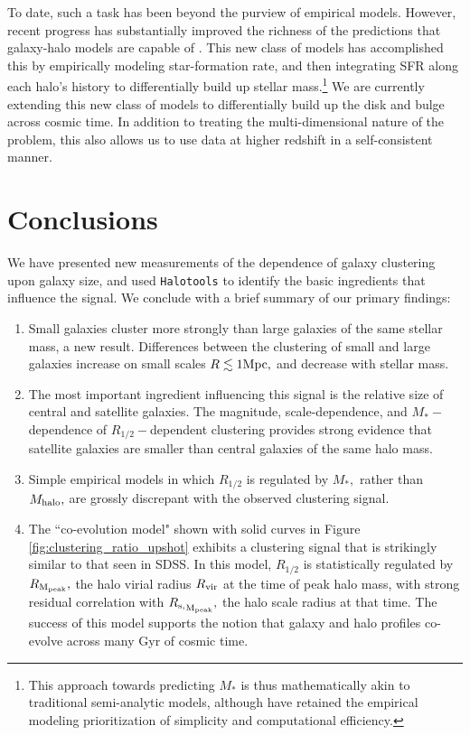 \documentclass[usenatbib,usegraphicx,letterpaper]{mn2e}
\newcommand{\ben}{\begin{enumerate}}
\newcommand{\een}{\end{enumerate}}
\newcommand{\rhalf}{R_{1/2}}
\newcommand{\mstar}{M_{\ast}}
\newcommand{\mhalo}{M_{\rm halo}}
\newcommand{\rvir}{R_{\rm vir}}
\newcommand{\rmpeak}{R_{\rm M_{peak}}}
\newcommand{\rspeak}{{R_{\rm s,}}_{\rm M_{peak}}}
\newcommand{\mpc}{{\rm Mpc}}
\begin{document}
To date, such a task has been beyond the purview of empirical models. However, recent progress has substantially improved the richness of the predictions that galaxy-halo models are capable of \citep{becker15,cohn17,moster_etal17}. This new class of models has accomplished this by empirically modeling star-formation rate, and then integrating SFR along each halo's history to differentially build up stellar mass.\footnote{This approach towards predicting $\mstar$ is thus mathematically akin to traditional semi-analytic models, although \citet{becker15} have retained the empirical modeling prioritization of simplicity and computational efficiency.} We are currently extending this new class of models to differentially build up the disk and bulge across cosmic time. In addition to treating the multi-dimensional nature of the problem, this also allows us to use data at higher redshift in a self-consistent manner.  


\section{Conclusions}
\label{sec:conclusion}

We have presented new measurements of the dependence of galaxy clustering upon galaxy size, and used {\tt Halotools} to identify the basic ingredients that influence the signal. We conclude with a brief summary of our primary findings:

\ben
\item Small galaxies cluster more strongly than large galaxies of the same stellar mass, a new result. Differences between the clustering of small and large galaxies increase on small scales $R\lesssim1\mpc,$ and decrease with stellar mass.
\item The most important ingredient influencing this signal is the relative size of central and satellite galaxies. The magnitude, scale-dependence, and $\mstar-$dependence of $\rhalf-$dependent clustering provides strong evidence that satellite galaxies are smaller than central galaxies of the same halo mass.
\item Simple empirical models in which $\rhalf$ is regulated by $\mstar,$ rather than $\mhalo,$ are grossly discrepant with the observed clustering signal.
\item The ``co-evolution model" shown with solid curves in Figure \ref{fig:clustering_ratio_upshot} exhibits a clustering signal that is strikingly similar to that seen in SDSS. In this model, $\rhalf$ is statistically regulated by $\rmpeak,$ the halo virial radius $\rvir$ at the time of peak halo mass, with strong residual correlation with $\rspeak,$ the halo scale radius at that time. The success of this model supports the notion that galaxy and halo profiles co-evolve across many Gyr of cosmic time.
\een
\end{document}
